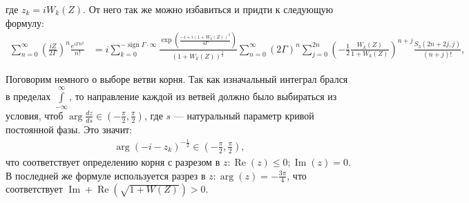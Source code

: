 \documentclass[a4paper, 12pt]{article}
\DeclareMathOperator*{\Res}{Res}
\DeclareMathOperator*{\sign}{sign}
\DeclareMathOperator*{\Real}{Re}
\DeclareMathOperator*{\Imag}{Im}
\begin{document}
где $z_k = i W_k(Z)$. От него так же можно избавиться и придти к следующую формулу:
\begin{equation}
\begin{aligned}
    \sum\limits_{n=0}^{\infty}\left(\frac{iZ}{2\Gamma}\right)^n  \frac{e^{i\Gamma n^2}}{n!} &= i
    \sum\limits_{k=0}^{-\sign\Gamma\cdot\infty} \frac{\exp\left(\frac{-i+i(1+W_k(Z))^2}{4\Gamma}\right)}{(1+W_k(Z))^{\frac{1}{2}}}
    \sum\limits_{n=0}^{\infty}\left(2\Gamma\right)^n
    \sum\limits_{j=0}^{2n}\left(-\frac{1}{2}\frac{W_k(Z)}{1+W_k(Z)}\right)^{n+j}\frac{S_3(2n+2j, j)}{(n+j)!},
\end{aligned}
\end{equation}

Поговорим немного о выборе ветви корня. Так как изначальный интеграл брался в пределах $\int\limits_{-\infty}^{\infty}$, то направление каждой из ветвей должно было выбираться из условия, чтоб $\arg\frac{dz}{ds}\in\left(-\frac{\pi}{2}, \frac{\pi}{2}\right)$, где $s$ --- натуральный параметр кривой постоянной фазы. Это значит:
\begin{equation}
\begin{aligned}
    \arg\left(-i-z_k\right)^{-\frac{1}{2}}\in\left(-\frac{\pi}{2}, \frac{\pi}{2}\right),
\end{aligned}
\end{equation}
что соответствует определению корня с разрезом в $z: \Real(z)\leq 0; \Imag(z)=0$. В последней же формуле используется разрез в $z: \arg(z) = -\frac{3\pi}{4}$, что соответствует $\Imag+\Real(\sqrt{1+W(Z)})>0$.



\end{document}
